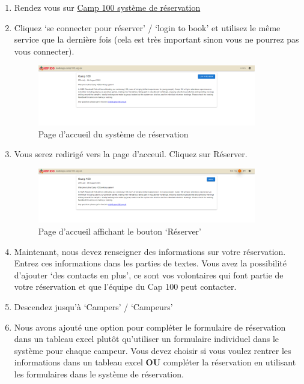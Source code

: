 \documentclass[a4paper, 11pt]{report}
\begin{document}
\begin{enumerate}
    \item Rendez vous sur \href{https://bookings.camp100.org.uk}{Camp 100 syst\`eme de r\'eservation}
    \item Cliquez `se connecter pour r\'eserver' / `login to book' et utilisez le m\^eme service que la derni\`ere fois (cela est tr\`es important sinon vous ne pourrez pas vous connecter).
    \begin{figure}[H]
        \centering
        \includegraphics[width=0.9\textwidth]{assets/2-home-prelogin.png}
        \caption{Page d'accueil du syst\`eme de r\'eservation}
    \end{figure}
    \item Vous serez redirig\'e vers la page d'acceuil. Cliquez sur R\'eserver.
    \begin{figure}[H]
        \centering
        \includegraphics[width=0.9\textwidth]{assets/2-home-loggedin.png}
        \caption{Page d'accueil affichant le bouton `R\'eserver'}
    \end{figure}
    \item Maintenant, nous devez renseigner des informations sur votre r\'eservation. Entrez ces informations dans les parties de textes. Vous avez la possibilit\'e d'ajouter `des contacts en plus', ce sont vos volontaires qui font partie de votre r\'eservation et que l'\'equipe du Cap 100 peut contacter. 
    \item Descendez jusqu'\`a `Campers' / `Campeurs'
    \item Nous avons ajout\'e une option pour compl\'eter le formulaire de r\'eservation dans un tableau excel plutôt qu'utiliser un formulaire individuel dans le syst\`eme pour chaque campeur. Vous devez choisir si vous voulez rentrer les informations dans un tableau excel  \textbf{OU} compl\'eter la r\'eservation en utilisant les formulaires dans le syst\`eme de r\'eservation. 
    

\end{enumerate}
\end{document}
